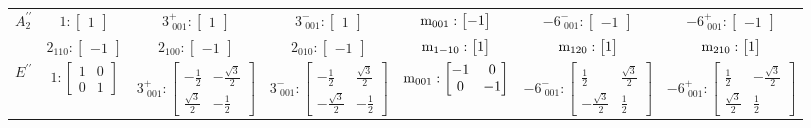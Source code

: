 \documentclass[fleqn,8pt,landscape]{jsarticle}
\begin{document}
\begin{longtable}{ccccccc}
$ A_{2}^{\prime\prime} $ & $ 1:\begin{bmatrix} 1 \end{bmatrix} $ & $ 3^{+}_{\,\,001}:\begin{bmatrix} 1 \end{bmatrix} $ & $ 3^{-}_{\,\,001}:\begin{bmatrix} 1 \end{bmatrix} $ & $ {\rm m}_{001}:\begin{bmatrix} -1 \end{bmatrix} $ & $ -6^{-}_{\,\,001}:\begin{bmatrix} -1 \end{bmatrix} $ & $ -6^{+}_{\,\,001}:\begin{bmatrix} -1 \end{bmatrix} $ \\
& $ 2{}_{110}:\begin{bmatrix} -1 \end{bmatrix} $ & $ 2{}_{100}:\begin{bmatrix} -1 \end{bmatrix} $ & $ 2{}_{010}:\begin{bmatrix} -1 \end{bmatrix} $ & $ {\rm m}_{1-10}:\begin{bmatrix} 1 \end{bmatrix} $ & $ {\rm m}_{120}:\begin{bmatrix} 1 \end{bmatrix} $ & $ {\rm m}_{210}:\begin{bmatrix} 1 \end{bmatrix} $ \\ \hline
$ E^{\prime\prime} $ & $ 1:\begin{bmatrix} 1 & 0 \\ 0 & 1 \end{bmatrix} $ & $ 3^{+}_{\,\,001}:\begin{bmatrix} - \frac{1}{2} & - \frac{\sqrt{3}}{2} \\ \frac{\sqrt{3}}{2} & - \frac{1}{2} \end{bmatrix} $ & $ 3^{-}_{\,\,001}:\begin{bmatrix} - \frac{1}{2} & \frac{\sqrt{3}}{2} \\ - \frac{\sqrt{3}}{2} & - \frac{1}{2} \end{bmatrix} $ & $ {\rm m}_{001}:\begin{bmatrix} -1 & 0 \\ 0 & -1 \end{bmatrix} $ & $ -6^{-}_{\,\,001}:\begin{bmatrix} \frac{1}{2} & \frac{\sqrt{3}}{2} \\ - \frac{\sqrt{3}}{2} & \frac{1}{2} \end{bmatrix} $ & $ -6^{+}_{\,\,001}:\begin{bmatrix} \frac{1}{2} & - \frac{\sqrt{3}}{2} \\ \frac{\sqrt{3}}{2} & \frac{1}{2} \end{bmatrix} $ \\

\end{longtable}
\end{document}
